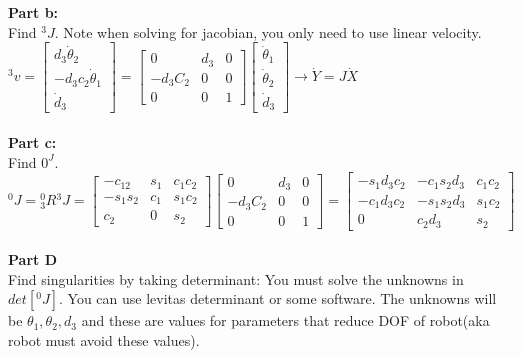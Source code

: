 \documentclass{article}
\begin{document}
\textbf{Part b:}\\
Find ${}^3J$. Note when solving for jacobian, you only need to use linear velocity. \\
${}^3v=\begin{bmatrix}
    d_3\dot{\theta}_2\\
    -d_3c_2\dot{\theta}_1\\
    \dot{d}_3
\end{bmatrix}=\begin{bmatrix}
0 & d_3 & 0\\
-d_3C_2 & 0 & 0\\
0 & 0 & 1
\end{bmatrix}\begin{bmatrix}
\dot{\theta}_1\\
\dot{\theta}_2\\
\dot{d}_3
\end{bmatrix} \rightarrow \dot{Y}=J\dot{X}$\\\\

\textbf{Part c:}\\
Find ${}0^J$. \\
${}^0J={}^0_3R {}^3J=\begin{bmatrix}
-c_{12} & s_1 & c_1c_2\\
-s_1s_2 & c_1 & s_1c_2\\
c_2 & 0 & s_2
\end{bmatrix}
\begin{bmatrix}
0 & d_3 & 0\\
-d_3C_2 & 0 & 0\\
0 & 0 & 1
\end{bmatrix}=\begin{bmatrix}
-s_1d_3c_2 & -c_1s_2d_3 & c_1c_2\\
-c_1d_3c_2 & -s_1s_2d_3 & s_1c_2\\
0 & c_2d_3 & s_2
\end{bmatrix}$\\\\
\textbf{Part D}\\
Find singularities by taking determinant: You must solve the unknowns in $det[{}^0J]$. You can use levitas determinant or some software. The unknowns will be $\theta_1, \theta_2, d_3$ and these are values for parameters that reduce DOF of robot(aka robot must avoid these values).
\end{document}
